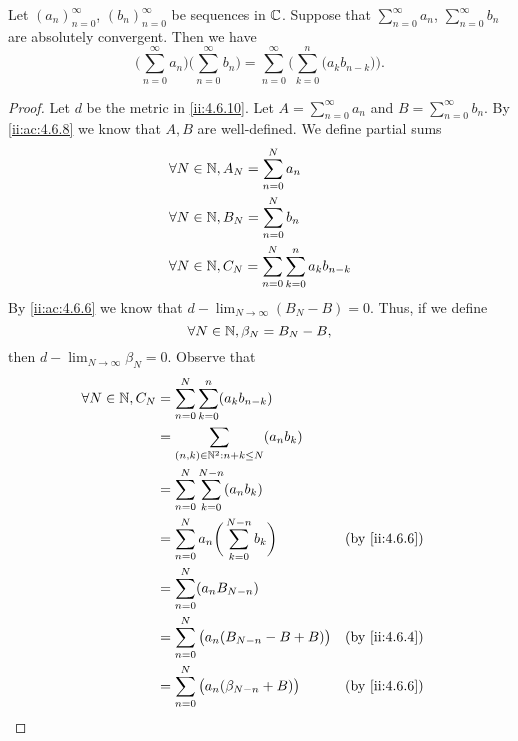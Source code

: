 \begin{ac}\label{ii:ac:4.6.9}
  Let \((a_n)_{n = 0}^\infty\), \((b_n)_{n = 0}^\infty\) be sequences in \(\mathbb{C}\).
  Suppose that \(\sum_{n = 0}^\infty a_n\), \(\sum_{n = 0}^\infty b_n\) are absolutely convergent.
  Then we have
  \[
    \bigg(\sum_{n = 0}^\infty a_n\bigg) \bigg(\sum_{n = 0}^\infty b_n\bigg) = \sum_{n = 0}^\infty \bigg(\sum_{k = 0}^n \big(a_k b_{n - k}\big)\bigg).
  \]
\end{ac}

\begin{proof}
  Let \(d\) be the metric in \cref{ii:4.6.10}.
  Let \(A = \sum_{n = 0}^\infty a_n\) and \(B = \sum_{n = 0}^\infty b_n\).
  By \cref{ii:ac:4.6.8} we know that \(A, B\) are well-defined.
  We define partial sums
  \begin{align*}
     & \forall N \in \mathbb{N}, A_N = \sum_{n = 0}^N a_n                          \\
     & \forall N \in \mathbb{N}, B_N = \sum_{n = 0}^N b_n                          \\
     & \forall N \in \mathbb{N}, C_N = \sum_{n = 0}^N \sum_{k = 0}^n a_k b_{n - k}
  \end{align*}
  By \cref{ii:ac:4.6.6} we know that \(d - \lim_{N \to \infty} (B_N - B) = 0\).
  Thus, if we define
  \[
    \forall N \in \mathbb{N}, \beta_N = B_N - B,
  \]
  then \(d - \lim_{N \to \infty} \beta_N = 0\).
  Observe that
  \begin{align*}
    \forall N \in \N, C_N & = \sum_{n = 0}^N \sum_{k = 0}^n (a_k b_{n - k})                                            \\
                          & = \sum_{(n, k) \in \N^2 : n + k \leq N} (a_n b_k)                                          \\
                          & = \sum_{n = 0}^N \sum_{k = 0}^{N - n} (a_n b_k)                                            \\
                          & = \sum_{n = 0}^N a_n \bigg(\sum_{k = 0}^{N - n} b_k\bigg)               &  & \by{ii:4.6.6} \\
                          & = \sum_{n = 0}^N (a_n B_{N - n})                                                           \\
                          & = \sum_{n = 0}^N \big(a_n (B_{N - n} - B + B)\big)                      &  & \by{ii:4.6.4} \\
                          & = \sum_{n = 0}^N \big(a_n (\beta_{N - n} + B)\big)                      &  & \by{ii:4.6.6} \\

\end{align*}
\end{proof}

